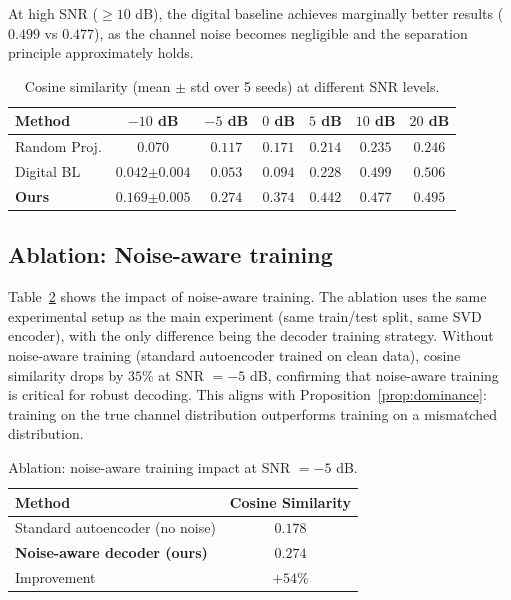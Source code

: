 \documentclass[a4paper,fleqn]{cas-sc}
\begin{document}
At high SNR ($\geq 10$ dB), the digital baseline achieves marginally better results ($0.499$ vs $0.477$), as the channel noise becomes negligible and the separation principle approximately holds.

\begin{table}[t]
\centering
\caption{Cosine similarity (mean $\pm$ std over 5 seeds) at different SNR levels.}\label{tab:snr}
\begin{tabular*}{\tblwidth}{@{}lcccccc@{}}
\toprule
Method & $-10$ dB & $-5$ dB & $0$ dB & $5$ dB & $10$ dB & $20$ dB \\
\midrule
Random Proj. & $0.070$ & $0.117$ & $0.171$ & $0.214$ & $0.235$ & $0.246$ \\
Digital BL & $0.042{\scriptstyle\pm0.004}$ & $0.053$ & $0.094$ & $0.228$ & $0.499$ & $0.506$ \\
\textbf{Ours} & $\mathbf{0.169}{\scriptstyle\pm0.005}$ & $\mathbf{0.274}$ & $\mathbf{0.374}$ & $\mathbf{0.442}$ & $0.477$ & $0.495$ \\
\bottomrule
\end{tabular*}
\end{table}

\subsection{Ablation: Noise-aware training}

Table~\ref{tab:ablation} shows the impact of noise-aware training. The ablation uses the same experimental setup as the main experiment (same train/test split, same SVD encoder), with the only difference being the decoder training strategy. Without noise-aware training (standard autoencoder trained on clean data), cosine similarity drops by $35\%$ at SNR $= -5$ dB, confirming that noise-aware training is critical for robust decoding. This aligns with Proposition~\ref{prop:dominance}: training on the true channel distribution outperforms training on a mismatched distribution.

\begin{table}[t]
\centering
\caption{Ablation: noise-aware training impact at SNR $= -5$ dB.}\label{tab:ablation}
\begin{tabular*}{\tblwidth}{@{}lc@{}}
\toprule
Method & Cosine Similarity \\
\midrule
Standard autoencoder (no noise) & $0.178$ \\
\textbf{Noise-aware decoder (ours)} & $\mathbf{0.274}$ \\
\midrule
Improvement & $+54\%$ \\
\bottomrule
\end{tabular*}
\end{table}
\end{document}
